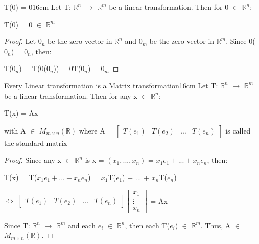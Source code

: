     \begin{wtheorem}{T(0) = 0}{16cm}
        Let T: $\mathbb{R}^n$ $\rightarrow$ $\mathbb{R}^m$
        be a linear transformation. Then for 0 $\in$ $\mathbb{R}^n$:

        \hspace{0.5cm}
        T(0) = 0 $\in$ $\mathbb{R}^m$
    \end{wtheorem}

    \begin{proof}
        Let $0_n$ be the zero vector in $\mathbb{R}^n$
        and $0_m$ be the zero vector in $\mathbb{R}^m$.
        Since 0($0_n$) = $0_n$, then:

        \hspace{0.5cm}
        T($0_n$) = T(0($0_n$)) = 0T($0_n$) = $0_m$
    \end{proof}

    \vspace{0.5cm}



    \begin{wtheorem}{Every Linear transformation is a Matrix transformation}{16cm}
        Let T: $\mathbb{R}^n$ $\rightarrow$ $\mathbb{R}^m$
        be a linear transformation. Then for any x $\in$ $\mathbb{R}^n$:

        \hspace{0.5cm}
        T(x) = Ax

        with A $\in$ $M_{m \times n}(\mathbb{R})$ where
        A =
        $\begin{bmatrix}
            T(e_1) & T(e_2) & \hdots & T(e_n)
        \end{bmatrix}$
        is called the {\color{lblue} standard matrix}
    \end{wtheorem}

    \begin{proof}
        Since any x $\in$ $\mathbb{R}^n$ is
        x = $(x_1,...,x_n)$
        = $x_1e_1 + ... + x_ne_n$, then:

        \hspace{0.5cm}
        T(x)
        = T($x_1e_1 + ... + x_ne_n$)
        = $x_1$T($e_1$) + ... + $x_n$T($e_n$)

        \hspace{1.5cm}
        $\Leftrightarrow$
        $\begin{bmatrix}
            T(e_1) & T(e_2) & \hdots & T(e_n)
        \end{bmatrix}
        \begin{bmatrix}
            x_1 \\
            \vdots \\
            x_n
        \end{bmatrix}$
        = Ax

        Since T: $\mathbb{R}^n$ $\rightarrow$ $\mathbb{R}^m$ and
        each $e_i$ $\in$ $\mathbb{R}^n$, then each T($e_i$) $\in$ $\mathbb{R}^m$.
        Thus, A $\in$ $M_{m \times n}(\mathbb{R})$.
    \end{proof}

